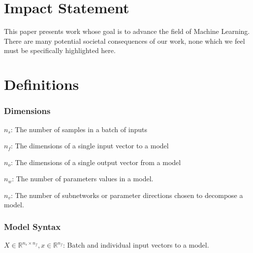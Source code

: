 \documentclass{article}
\theoremstyle{plain}
\theoremstyle{definition}
\theoremstyle{remark}
\begin{document}
\clearpage

\section{Impact Statement}

This paper presents work whose goal is to advance the field of Machine Learning. There are many potential societal consequences of our work, none which we feel must be specifically highlighted here.


\clearpage




\newpage
\appendix
\renewcommand{\thefigure}{S\arabic{figure}}  %
\renewcommand{\theHfigure}{S\arabic{figure}} %
\setcounter{figure}{0}  %
\onecolumn


\section{Definitions}

\subsubsection{Dimensions}
$n_s$: The number of samples in a batch of inputs 

$n_f$: The dimensions of a single input vector to a model

$n_o$: The dimensions of a single output vector from a model

$n_w$: The number of parameters values in a model.

$n_v$: The number of subnetworks or parameter directions chosen to decompose a model. 


\subsubsection{Model Syntax}
$X \in \mathbb{R}^{n_s \times n_f}, x \in \mathbb{R}^{n_f}$: Batch and individual input vectors to a model.
\end{document}
